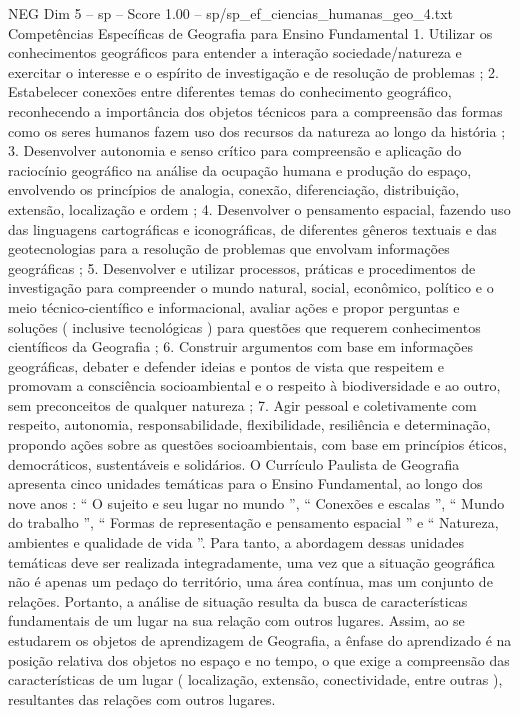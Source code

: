 \begin{textsample}{NEG Dim 5 – sp – Score 1.00 – sp/sp\_ef\_ciencias\_humanas\_geo\_4.txt}  \label{ex:f5_neg_213}
Competências Específicas de Geografia para Ensino Fundamental 1.
Utilizar os conhecimentos geográficos para entender a interação sociedade/natureza e exercitar o interesse e o espírito de investigação e de resolução de problemas ; 2.
Estabelecer conexões entre diferentes temas do conhecimento geográfico, reconhecendo a importância dos objetos técnicos para a compreensão das formas como os seres humanos fazem uso dos recursos da natureza ao longo da história ; 3.
Desenvolver autonomia e senso crítico para compreensão e aplicação do raciocínio geográfico na análise da ocupação humana e produção do espaço, envolvendo os princípios de analogia, conexão, diferenciação, distribuição, extensão, localização e ordem ; 4.
Desenvolver o pensamento espacial, fazendo uso das linguagens cartográficas e iconográficas, de diferentes gêneros textuais e das geotecnologias para a resolução de problemas que envolvam informações geográficas ; 5.
Desenvolver e utilizar processos, práticas e procedimentos de investigação para compreender o mundo natural, social, econômico, político e o meio técnico-científico e informacional, avaliar ações e propor perguntas e soluções ( inclusive tecnológicas ) para questões que requerem conhecimentos científicos da Geografia ; 6.
Construir argumentos com base em informações geográficas, debater e defender ideias e pontos de vista que respeitem e promovam a consciência socioambiental e o respeito à biodiversidade e ao outro, sem preconceitos de qualquer natureza ; 7.
Agir pessoal e coletivamente com respeito, autonomia, responsabilidade, flexibilidade, resiliência e determinação, propondo ações sobre as questões socioambientais, com base em princípios éticos, democráticos, sustentáveis e solidários.
O Currículo Paulista de Geografia apresenta cinco unidades temáticas para o Ensino Fundamental, ao longo dos nove anos : “ O sujeito e seu lugar no mundo ”, “ Conexões e escalas ”, “ Mundo do trabalho ”, “ Formas de representação e pensamento espacial ” e “ Natureza, ambientes e qualidade de vida ”.
Para tanto, a abordagem dessas unidades temáticas deve ser realizada integradamente, uma vez que a situação geográfica não é apenas um pedaço do território, uma área contínua, mas um conjunto de relações.
Portanto, a análise de situação resulta da busca de características fundamentais de um lugar na sua relação com outros lugares.
Assim, ao se estudarem os objetos de aprendizagem de Geografia, a ênfase do aprendizado é na posição relativa dos objetos no espaço e no tempo, o que exige a compreensão das características de um lugar ( localização, extensão, conectividade, entre outras ), resultantes das relações com outros lugares.

\end{textsample}
